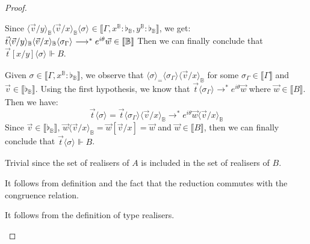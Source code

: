 \documentclass[a4paper,UKenglish,numberwithinsect,pdfa,anonymous]{lipics-v2021}
\theoremstyle{restatestyle}
\newcommand\lra{\longrightarrow}
\newcommand\ansubst[2]{\ensuremath{\langle #1 \rangle_{#2}}}
\def\eval{\lra^*}
\def\BB{\mathbb{B}}
\def\sem#1{\llbracket#1\rrbracket}
\def\real{\Vdash}
\newcommand\basis[1]{\ensuremath{\flat_{#1}}}
\begin{document}
\begin{proof}
\begin{description}
    Since $\ansubst{\vec{v}/y}{\BB}\ansubst{\vec{v}/x}{\BB}\ansubst{\sigma}{}\in\sem{\Gamma, x^\BB:\basis{\BB}, y^\BB:\basis{\BB}}$, we get: $\vec{t}\ansubst{\vec{v}/y}{\BB}\ansubst{\vec{v}/x}{\BB}\\\ansubst{\sigma_\Gamma}{}\eval e^{i\theta}\vec{w}\in\sem{\BB}$
    Then we can finally conclude that $\vec{t}[x/y]\ansubst{\sigma}{}\real B$.

    \item[Weak] Given $\sigma\in\sem{\Gamma,x^\BB:\basis{\BB}}$, we observe that $\ansubst{\sigma}=\ansubst{\sigma_\Gamma}{}\ansubst{\vec{v}/x}{\BB}$ for some $\sigma_\Gamma\in\sem{\Gamma}$ and $\vec{v}\in\sem{\basis{\BB}}$. Using the first hypothesis, we know that $\vec{t}\ansubst{\sigma_\Gamma}{}\eval e^{i\theta}\vec{w}$ where $\vec{w}\in\sem{B}$. Then we have:
    \[
    \vec{t}\ansubst{\sigma}{}=\vec{t}\ansubst{\sigma_\Gamma}{}\ansubst{\vec{v}/x}{\BB}\eval e^{i\theta}\vec{w}\ansubst{\vec{v}/x}{\BB}
    \]
    Since $\vec{v}\in\sem{\basis{\BB}}$, $\vec{w}\ansubst{\vec{v}/x}{\BB}=\vec{w}[\vec{v}/x]=\vec{w}$ and $\vec{w}\in\sem{B}$, then we can finally conclude that $\vec{t}\ansubst{\sigma}{}\real B$.
    
    \item[Sub] Trivial since the set of realisers of ${A}$ is included in the set of realisers of ${B}$. 

    \item[Equiv] It follows from definition and the fact that the reduction commutes with the congruence relation.
    
    \item[Phase] It follows from the definition of type realisers.
      \qedhere
    \end{description}
\end{proof}
\end{document}
